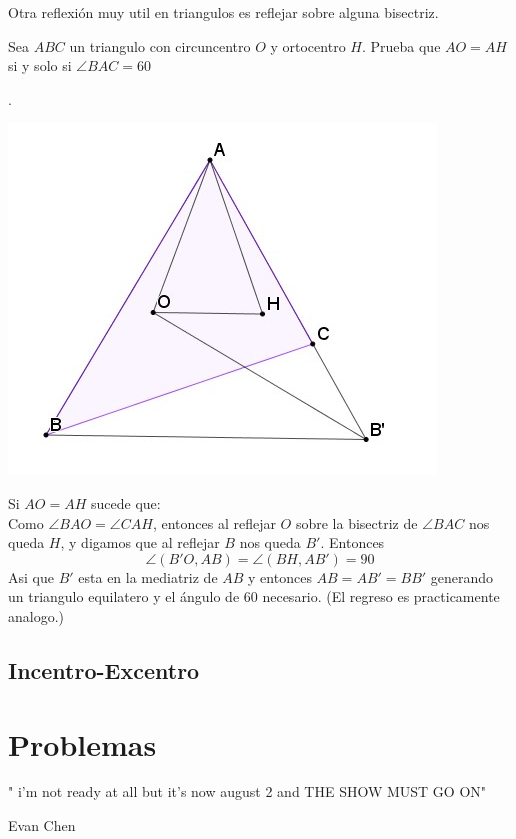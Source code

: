 \documentclass[11pt]{scrartcl}
\begin{document}
    Otra reflexi\'on muy util en triangulos es reflejar sobre alguna bisectriz. 
    \begin{example}
        Sea $ABC$ un triangulo con circuncentro $O$ y ortocentro $H$. Prueba que $AO=AH$ si y solo si $\angle BAC=60$
    \end{example}
    \begin{soln}
    .
        \begin{center}
            \includegraphics[scale=0.5]{Img16.jpg}
        \end{center}
        Si $AO=AH$ sucede que: \\
        Como $\angle BAO=\angle CAH$, entonces al reflejar $O$ sobre la bisectriz de $\angle BAC$ nos queda $H$, y digamos que al reflejar $B$ nos queda $B'$. Entonces 
        $$\angle (B'O, AB)=\angle (BH, AB')=90$$
        Asi que $B'$ esta en la mediatriz de $AB$ y entonces $AB=AB'=BB'$ generando un triangulo equilatero y el \'angulo de 60 necesario. 
        (El regreso es practicamente analogo.)
    \end{soln}

\subsection{Incentro-Excentro}



\newpage
\section{Problemas}
\epigraph{" i'm not ready at all but it's now august 2 and THE SHOW MUST GO ON"
}{Evan Chen}
\end{document}

